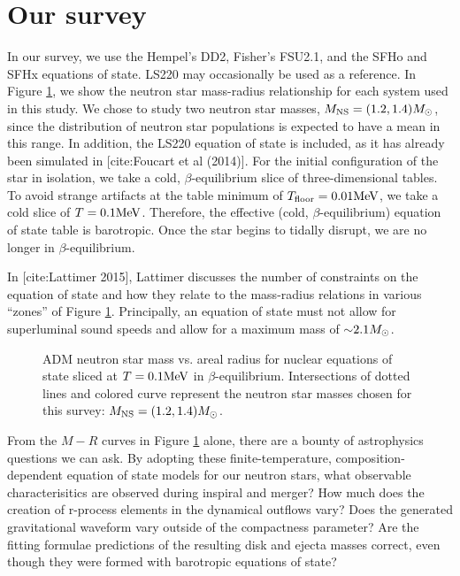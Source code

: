 \section{Our survey}

In our survey, we use the Hempel's DD2, Fisher's FSU2.1, and the SFHo and SFHx equations of state.  LS220 may occasionally be used as a reference. 
In Figure \ref{fig:MvsR}, we show the neutron star mass-radius relationship for each system used in this study.  We chose to study two neutron star masses, $M_{\rm NS} = (1.2, 1.4) M_{\odot}$, since the distribution of neutron star populations is expected to have a mean in this range. In addition, the LS220 equation of state is included, as it has already been simulated in [cite:Foucart et al (2014)].  For the initial configuration of the star in isolation, we take a cold, $\beta$-equilibrium slice of three-dimensional tables.  To avoid strange artifacts at the table minimum of $T_{\rm floor} = 0.01 {\rm MeV}$, we take a cold slice of  $T = 0.1 {\rm MeV}$.  Therefore, the effective (cold, $\beta$-equilibrium) equation of state table is barotropic. Once the star begins to tidally disrupt, we are no longer in $\beta$-equilibrium.

In [cite:Lattimer 2015], Lattimer discusses the number of constraints on the equation of state and how they relate to the mass-radius relations in various ``zones'' of Figure \ref{fig:MvsR}.  Principally, an equation of state must not allow for superluminal sound speeds and allow for a maximum mass of $\mathord{\sim} 2.1 M_{\odot}$.

\begin{figure}
	\centering
	
	\caption[Neutron star mass vs. areal radius]{
		ADM neutron star mass vs. areal radius for nuclear equations of state sliced at $T=0.1{\rm MeV}$ in $\beta$-equilibrium.  Intersections of dotted lines and colored curve represent the neutron star masses chosen for this survey: $M_{\rm NS} = (1.2, 1.4) M_{\odot}$.  
	}
	\label{fig:MvsR}
\end{figure}

From the $M-R$ curves in Figure \ref{fig:MvsR} alone, there are a bounty of astrophysics questions we can ask.  By adopting these finite-temperature, composition-dependent equation of state models for our neutron stars, what observable characterisitics are observed during inspiral and merger?  How much does the creation of r-process elements in the dynamical outflows vary?  Does the generated gravitational waveform vary outside of the compactness parameter?  Are the fitting formulae predictions of the resulting disk and ejecta masses correct, even though they were formed with barotropic equations of state?

